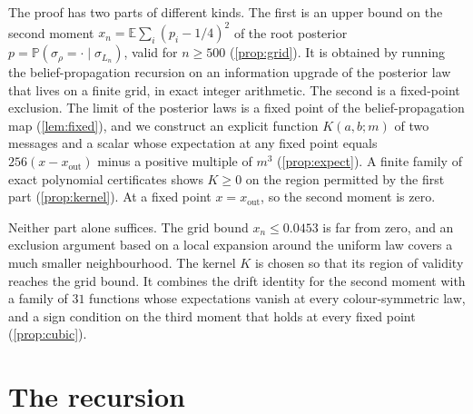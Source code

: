 \documentclass[11pt]{amsart}
\theoremstyle{definition}
\theoremstyle{remark}
\newcommand{\E}{\mathbb{E}}
\begin{document}
The proof has two parts of different kinds. The first is an upper bound on the second moment
$x_n=\E\sum_i(p_i-1/4)^2$ of the root posterior $p=\mathbb P(\sigma_\rho=\cdot\mid\sigma_{L_n})$, valid
for $n\ge500$ (\cref{prop:grid}). It is obtained by running the belief-propagation recursion on an
information upgrade of the posterior law that lives on a finite grid, in exact integer arithmetic. The
second is a fixed-point exclusion. The limit of the posterior laws is a fixed point of the
belief-propagation map (\cref{lem:fixed}), and we construct an explicit function $K(a,b;m)$ of two
messages and a scalar whose expectation at any fixed point equals $256(x-x_{\mathrm{out}})$ minus a
positive multiple of $m^3$ (\cref{prop:expect}). A finite family of exact polynomial certificates shows
$K\ge0$ on the region permitted by the first part (\cref{prop:kernel}). At a fixed point
$x=x_{\mathrm{out}}$, so the second moment is zero.

Neither part alone suffices. The grid bound $x_n\le0.0453$ is far from zero, and an exclusion argument
based on a local expansion around the uniform law covers a much smaller neighbourhood. The kernel $K$ is chosen
so that its region of validity reaches the grid bound. It combines the drift identity for the second
moment with a family of $31$ functions whose expectations vanish at every colour-symmetric law, and a
sign condition on the third moment that holds at every fixed point (\cref{prop:cubic}).

\section{The recursion}\label{sec:recursion}
\end{document}
